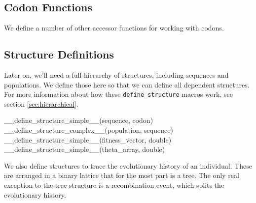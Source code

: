\documentclass{article}
\begin{document}
    \subsection{Codon Functions}
      \label{sec:codon-functions}

      We define a number of other accessor functions for working with codons.


    \subsection{Structure Definitions}
      \label{sec:structure-definitions}

      Later on, we'll need a full hierarchy of structures, including sequences
      and populations. We define those here so that we can define all dependent
      structures. For more information about how these \verb|define_structure|
      macros work, see section \ref{sec:hierarchical}.

\begin{ccode}
__define_structure_simple__(sequence, codon)
__define_structure_complex__(population, sequence)
__define_structure_simple__(fitness_vector, double)
__define_structure_simple__(theta_array, double)
\end{ccode}

      We also define structures to trace the evolutionary history of an
      individual. These are arranged in a binary lattice that for the most part
      is a tree. The only real exception to the tree structure is a
      recombination event, which splits the evolutionary history.
\end{document}
